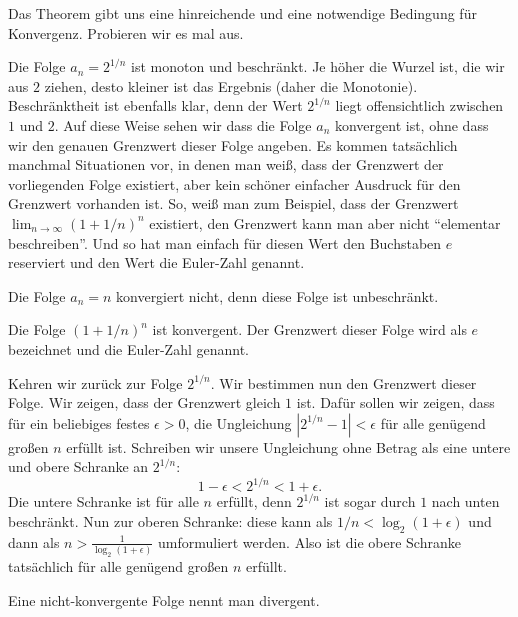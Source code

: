 \begin{bsp} 
	Das Theorem gibt uns eine hinreichende und eine notwendige Bedingung für Konvergenz. Probieren wir es mal aus. 
	\begin{enuma}
		\item Die Folge $a_n = 2^{1/n}$ ist monoton und beschränkt. Je höher die Wurzel ist, die wir aus $2$ ziehen, desto kleiner ist das Ergebnis (daher die Monotonie). Beschränktheit ist ebenfalls klar, denn der Wert $2^{1/n}$ liegt offensichtlich zwischen $1$ und $2$. Auf diese Weise sehen wir dass die Folge $a_n$ konvergent ist, ohne dass wir den genauen Grenzwert dieser Folge angeben. Es kommen tatsächlich manchmal Situationen vor, in denen man weiß, dass der Grenzwert der vorliegenden Folge existiert, aber kein schöner einfacher Ausdruck für den Grenzwert vorhanden ist. So, weiß man zum Beispiel, dass der Grenzwert $\lim_{n \to \infty} (1+ 1/n)^n$ existiert, den Grenzwert kann man aber nicht ``elementar beschreiben''. Und so hat man einfach für diesen Wert den Buchstaben $e$ reserviert und den Wert die Euler-Zahl genannt. 
		\item Die Folge $a_n = n$ konvergiert nicht, denn diese Folge ist unbeschränkt. 
	\end{enuma} 
\end{bsp} 

\begin{thm}
	Die Folge $(1+ 1/n)^n$ ist konvergent. Der Grenzwert dieser Folge wird als $e$ bezeichnet und die Euler-Zahl genannt. 
\end{thm} 

\begin{bsp} 
	Kehren wir zurück zur Folge $2^{1/n}$. Wir bestimmen nun den Grenzwert dieser Folge. Wir zeigen, dass der Grenzwert gleich $1$ ist. Dafür sollen wir zeigen, dass für ein beliebiges festes $\epsilon>0$, die Ungleichung $|2^{1/n} - 1| < \epsilon$ für alle genügend großen $n$ erfüllt ist. Schreiben wir unsere Ungleichung ohne Betrag als eine untere und obere Schranke an $2^{1/n}$: 
	\[
		1 - \epsilon < 2^{1/n} < 1 + \epsilon. 
	\]
	Die untere Schranke ist für alle $n$ erfüllt, denn $2^{1/n}$ ist sogar durch $1$ nach unten beschränkt. Nun zur oberen Schranke: diese kann als $1/n < \log_2 (1 + \epsilon)$ und dann als $n > \frac{1}{\log_2 (1 +\epsilon) }$ umformuliert werden. Also ist die obere Schranke tatsächlich für alle genügend großen $n$ erfüllt. 
\end{bsp} 

\begin{defn}
	Eine nicht-konvergente Folge nennt man divergent. 
\end{defn} 

